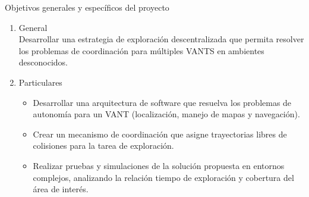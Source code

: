 \documentclass[
  24pt, %
  aspectratio=169, %
]{beamer}
\begin{document}
\begin{frame}{Objetivos generales y específicos del proyecto}
  \begin{enumerate}
    \item General \\
    \bigskip
    Desarrollar una estrategia de exploración descentralizada que permita resolver los problemas de coordinación para múltiples VANTS en ambientes desconocidos.
    \pause
    \bigskip
    \item Particulares\\
    
    \begin{itemize}
    \item Desarrollar una arquitectura de software que resuelva los problemas de autonomía para un VANT (localización, manejo de mapas y navegación).
    \item Crear un mecanismo de coordinación que asigne trayectorias libres de colisiones para la tarea de exploración.
    \item Realizar pruebas y simulaciones de la solución propuesta en entornos complejos, analizando la relación tiempo de exploración y cobertura del área de interés.
    \end{itemize}
  \end{enumerate}
\end{frame}

\end{document}
